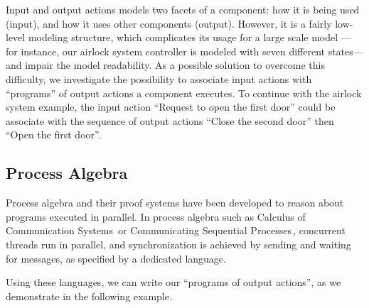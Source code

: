Input and output actions models two facets of a component: how it is being used
(input), and how it uses other components (output).
%
However, it is a fairly low-level modeling structure, which complicates its
usage for a large scale model --- for instance, our airlock system controller is
modeled with seven different states--- and impair the model readability.
%
As a possible solution to overcome this difficulty, we investigate the
possibility to associate input actions with ``programs'' of output actions a
component executes.
%
To continue with the airlock system example, the input action ``Request to open
the first door'' could be associate with the sequence of output actions ``Close
the second door'' then ``Open the first door''. 

\subsection{Process Algebra}
\label{subsec:sota:palgebra}

Process algebra and their proof systems have been developed to reason about
programs executed in parallel.
%
In process algebra such as Calculus of Communication
Systems\,\cite{milner1980ccs} or Communicating Sequential
Processes\,\cite{hoare1978csp}, concurrent threads run in parallel, and
synchronization is achieved by sending and waiting for messages, as specified by
a dedicated language.

Using these languages, we can write our ``programs of output actions'', as we
demonstrate in the following example.

